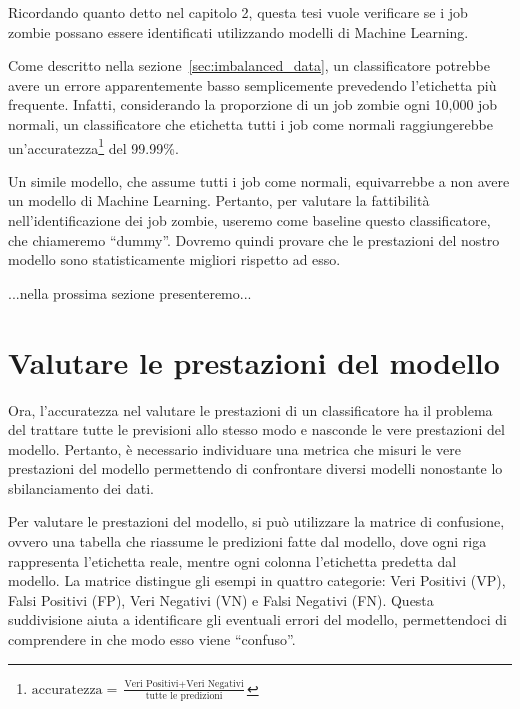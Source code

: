 \label{chap:valutazioni}





Ricordando quanto detto nel capitolo 2, questa tesi vuole verificare se i job
zombie possano essere identificati utilizzando modelli di Machine Learning.

Come descritto nella sezione~\ref{sec:imbalanced_data}, un classificatore
potrebbe avere un errore apparentemente basso semplicemente prevedendo
l'etichetta più frequente. Infatti, considerando la proporzione di un job
zombie ogni 10,000 job normali, un classificatore che etichetta tutti i job
come normali raggiungerebbe
un'accuratezza\footnote{$\text{accuratezza}=\frac{\text{Veri
Positivi}+\text{Veri Negativi}}{\text{tutte le predizioni}}$} del 99.99\%.

Un simile modello, che assume tutti i job come normali, equivarrebbe a non
avere un modello di Machine Learning. Pertanto, per valutare la fattibilità
nell'identificazione dei job zombie, useremo come baseline questo
classificatore, che chiameremo ``dummy''. Dovremo quindi provare che le
prestazioni del nostro modello sono statisticamente migliori rispetto ad esso.

...nella prossima sezione presenteremo...

\section{Valutare le prestazioni del modello}

Ora, l'accuratezza nel valutare le prestazioni di un classificatore ha il
problema del trattare tutte le previsioni allo stesso modo e nasconde le vere
prestazioni del modello. Pertanto, è necessario individuare una metrica che
misuri le vere prestazioni del modello permettendo di confrontare diversi
modelli nonostante lo sbilanciamento dei dati.

Per valutare le prestazioni del modello, si può utilizzare la matrice di
confusione, ovvero una tabella che riassume le predizioni fatte dal modello,
dove ogni riga rappresenta l'etichetta reale, mentre ogni colonna l'etichetta
predetta dal modello. La matrice distingue gli esempi in quattro categorie:
Veri Positivi (VP), Falsi Positivi (FP), Veri Negativi (VN) e Falsi Negativi
(FN). Questa suddivisione aiuta a identificare gli eventuali errori del
modello, permettendoci di comprendere in che modo esso viene ``confuso''.

